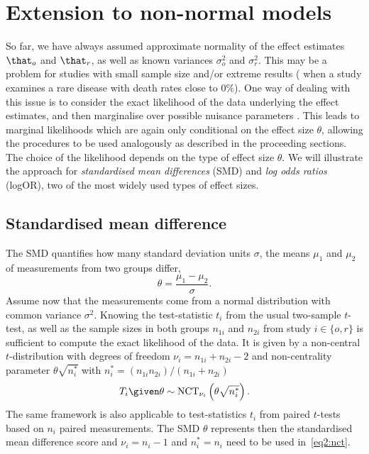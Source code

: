 \section{Extension to non-normal models} \label{sec2:tdist}
So far, we have always assumed approximate normality of the effect estimates
$\that_o$ and $\that_r$, as well as known variances $\sigma^2_o$ and
$\sigma^2_r$. This may be a problem for studies with small sample size and/or
extreme results (\eg{} when a study examines a rare disease with death rates close
to 0\%). One way of dealing with this issue is to consider the exact likelihood
of the data underlying the effect estimates, and then marginalise over possible
nuisance parameters \citep[Chapter 8.2.2]{Spiegelhalter2004}. This leads to
marginal likelihoods which are again only conditional on the effect size
$\theta$, allowing the procedures to be used analogously as described in the
proceeding sections. The choice of the likelihood depends on the type of effect
size $\theta$. We will illustrate the approach for \emph{standardised mean
differences} (SMD) and \emph{log odds ratios} (logOR), two of the most widely
used types of effect sizes.

\subsection{Standardised mean difference}
The SMD quantifies how many standard deviation units $\sigma$, the means $\mu_1$
and $\mu_2$ of measurements from two groups differ, \ie{}
$$\theta = \frac{\mu_1 - \mu_2}{\sigma}.$$
Assume now that the measurements come from a normal distribution with common
variance $\sigma^2$. Knowing the test-statistic $t_i$ from the usual two-sample
$t$-test, as well as the sample sizes in both groups $n_{1i}$ and $n_{2i}$ from
study $i \in \{o, r\}$ is sufficient to compute the exact likelihood of the
data. It is given by a non-central $t$-distribution with degrees of freedom
$\nu_i = n_{1i} + n_{2i} - 2$ and non-centrality parameter $\theta \sqrt{n^*_i}$
with $n^*_i = (n_{1i}n_{2i})/(n_{1i} + n_{2i})$ \citep{Bayarri2002}
\begin{align}
  \label{eq2:nct}
  T_i \given \theta \sim \text{NCT}_{\nu_i} \left(\theta \sqrt{n^*_i}\right).
\end{align}
The same framework is also applicable to test-statistics $t_{i}$ from paired
$t$-tests based on $n_{i}$ paired measurements. The SMD $\theta$ represents then
the standardised mean difference score and $\nu_{i} = n_{i} - 1$ and
$n_{i}^{*} = n_{i}$ need to be used in~\eqref{eq2:nct}.


